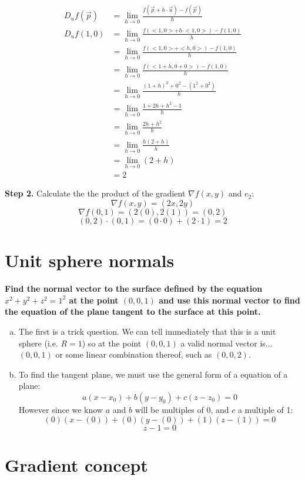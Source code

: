 \documentclass{article}
\begin{document}
\begin{equation}
\begin{split}
D_{u}f(\vec{p})& =\lim_{h \to 0} \frac{f(\vec{p}+h\cdot\vec{u})-f(\vec{p})}{h}\\
D_{u}f(1,0)& =\lim_{h \to 0} \frac{f(<1,0>+h\cdot<1,0>)-f(1,0)}{h}\\
& =\lim_{h \to 0} \frac{f(<1,0>+<h,0>)-f(1,0)}{h}\\
& =\lim_{h \to 0} \frac{f(<1+h,0+0>)-f(1,0)}{h}\\
& =\lim_{h \to 0} \frac{(1+h)^{2}+0^{2}-(1^{2}+0^{2})}{h}\\
& =\lim_{h \to 0} \frac{1+2h+h^{2}-1}{h}\\
& =\lim_{h \to 0} \frac{2h+h^{2}}{h}\\
& =\lim_{h \to 0} \frac{h(2+h)}{h}\\
& =\lim_{h \to 0} (2+h)\\
& =2
\end{split}
\end{equation}

	\textbf{Step 2.} Calculate the the product of the gradient $\nabla f(x,y)$ and $e_2$:
	\[\nabla f(x,y)=(2x,2y)\]
	\[\nabla f(0,1)=(2(0),2(1)) = (0,2)\]
	\[(0,2)\cdot(0,1)=(0\cdot0)+(2\cdot1)=2\]

\section{Unit sphere normals}
    \textbf{Find the normal vector to the surface defined by the equation $x^{2} + y^{2} + z^{2} =1^{2}$ at the point $(0,0,1)$ and use this normal vector to find the equation of the plane tangent to the surface at this point.}
\begin{enumerate}[a.]
    \item The first is a trick question. We can tell immediately that this is a unit sphere (i.e. $R=1$) so at the point $(0,0,1)$ a valid normal vector is... $(0,0,1)$ or some linear combination thereof, such as $(0,0,2)$.
    \item To find the tangent plane, we must use the general form of a equation of a plane: 
    \[a(x-x_{0})+b(y-y_{0})+c(z-z_{0})=0\]
	However since we know $a$ and $b$ will be multiples of 0, and $c$ a multiple of 1:
	\[(0)(x-(0))+(0)(y-(0))+(1)(z-(1))=0\]
	\[z-1=0\]
\end{enumerate}

\section{Gradient concept}
\end{document}
